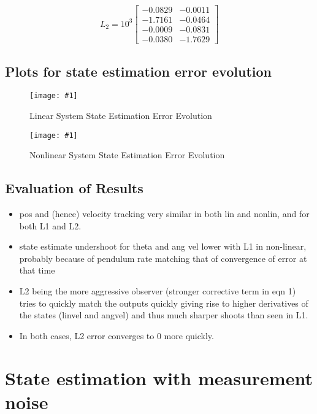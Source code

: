 \documentclass[10pt]{article}
\newcommand{\shrinkimage}[1]{\texttt{[image: \#1]}}
\begin{document}
\begin{equation*}
    L_2 = 10^{3} \begin{bmatrix}
    -0.0829  & -0.0011 \\
    -1.7161  & -0.0464 \\ 
    -0.0009  & -0.0831 \\ 
    -0.0380  & -1.7629
    \end{bmatrix}
\end{equation*}

\subsection{Plots for state estimation error evolution}
\begin{figure}[h!]
    \centering
    \shrinkimage{lab4/figs/lin_noiseless_state_est_error.pdf}
    \caption{Linear System State Estimation Error Evolution}
    \label{fig:lin_noiseless_state_est_error}
\end{figure}

\begin{figure}[h!]
    \centering
    \shrinkimage{lab4/figs/nlin_noiseless_state_est_error.pdf}
    \caption{Nonlinear System State Estimation Error Evolution}
    \label{fig:nlin_noiseless_state_est_error}
\end{figure}

\subsection{Evaluation of Results}
\begin{itemize}
\item pos and (hence) velocity tracking very similar in both lin and nonlin, and for both L1 and L2.
\item state estimate undershoot for theta and ang vel lower with L1 in non-linear, probably because of pendulum rate matching that of convergence of error at that time
\item L2 being the more aggressive observer (stronger corrective term in eqn 1) tries to quickly match the outputs quickly giving rise to higher derivatives of the states (linvel and angvel) and thus much sharper shoots than seen in L1.
\item In both cases, L2 error converges to 0 more quickly.
\end{itemize}

\section{State estimation with measurement noise}
\end{document}
